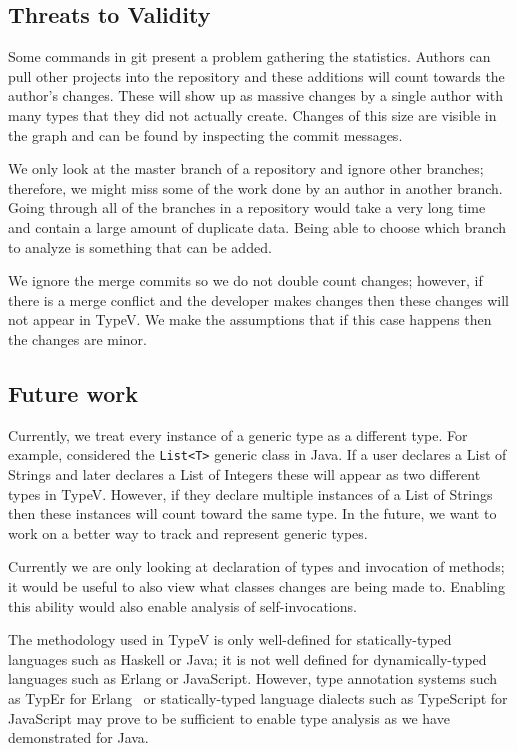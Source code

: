\subsection{Threats to Validity}

Some commands in git present a problem gathering the statistics. Authors can pull other projects into the repository and these additions will count towards the author's changes. These will show up as massive changes by a single author with many types that they did not actually create. Changes of this size are visible in the graph and can be found by inspecting the commit messages.

We only look at the master branch of a repository and ignore other branches; therefore, we might miss some of the work done by an author in another branch. Going through all of the branches in a repository would take a very long time and contain a large amount of duplicate data. Being able to choose which branch to analyze is something that can be added.

We ignore the merge commits so we do not double count changes; however, if there is a merge conflict and the developer makes changes then these changes will not appear in TypeV. We make the assumptions that if this case happens then the changes are minor.


\subsection{Future work}

Currently, we treat every instance of a generic type as a different type. For example, considered the \texttt{List<T>} generic class in Java. If a user declares a List of Strings and later declares a List of Integers these will appear as two different types in TypeV. However, if they declare multiple instances of a List of Strings then these instances will count toward the same type. In the future, we want to work on a better way to track and represent generic types.

Currently we are only looking at declaration of types and invocation of methods; it would be useful to also view what classes changes are being made to. Enabling this ability would also enable analysis of self-invocations.

The methodology used in TypeV is only well-defined for statically-typed languages such as Haskell or Java; it is not well defined for dynamically-typed languages such as Erlang or JavaScript. However, type annotation systems such as TypEr for Erlang~\cite{typer} or statically-typed language dialects such as TypeScript for JavaScript may prove to be sufficient to enable type analysis as we have demonstrated for Java.


